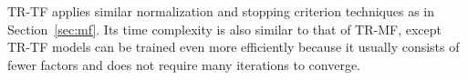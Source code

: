 TR-TF applies similar normalization and stopping criterion techniques as in Section~\ref{sec:mf}.
Its time complexity is also similar to that of TR-MF,
except TR-TF models can be trained even more efficiently because it usually consists of fewer factors and does not require many iterations to converge. 
